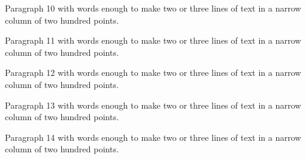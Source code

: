 Paragraph 10 with words enough to make two or three lines of text in a narrow column of two hundred points.\par{} \copy\held \noindent\unhcopy\held\par
Paragraph 11 with words enough to make two or three lines of text in a narrow column of two hundred points.\par{} \copy\held \noindent\unhcopy\held\par
Paragraph 12 with words enough to make two or three lines of text in a narrow column of two hundred points.\par{} \copy\held \noindent\unhcopy\held\par
Paragraph 13 with words enough to make two or three lines of text in a narrow column of two hundred points.\par{} \copy\held \noindent\unhcopy\held\par
Paragraph 14 with words enough to make two or three lines of text in a narrow column of two hundred points.\par{} \copy\held \noindent\unhcopy\held\par
\bye
